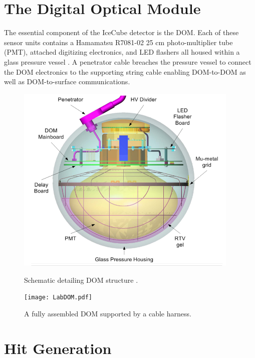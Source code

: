 \documentclass{gatech-thesis}
\begin{document}
\section{The Digital Optical Module}
The essential component of the IceCube detector is the DOM. Each of these sensor units contains a Hamamatsu R7081-02 25 cm photo-multiplier tube (PMT), attached digitizing electronics, and LED flashers all housed within a glass pressure vessel \cite{2006NIMPA.567..214H}. A penetrator cable breaches the pressure vessel to connect the DOM electronics to the supporting string cable enabling DOM-to-DOM as well as DOM-to-surface communications.

\begin{figure}[ht]
\centering
\begin{minipage}[b]{0.45\linewidth}
\includegraphics[width=0.95\textwidth]{DomSchematic.png}
\caption{Schematic detailing DOM structure \cite{2009NIMPA.601..294A}.}
\label{fig:domscheme}
\end{minipage}
\quad
\begin{minipage}[b]{0.45\linewidth}
\begin{center}
\texttt{[image: LabDOM.pdf]}
\end{center}
\caption{A fully assembled DOM supported by a cable harness.}
\label{fig:dompic}
\end{minipage}
\end{figure}
\section{Hit Generation}
\end{document}
